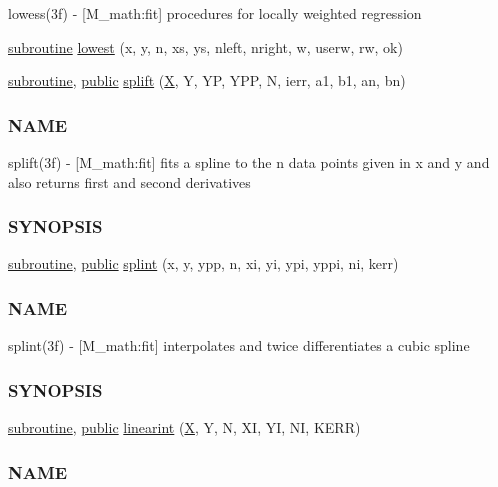 \begin{DoxyCompactItemize}
\begin{DoxyCompactList}
lowess(3f) -\/ \mbox{[}M\+\_\+math\+:fit\mbox{]} procedures for locally weighted regression \end{DoxyCompactList}\item 
\hyperlink{M__stopwatch_83_8txt_acfbcff50169d691ff02d4a123ed70482}{subroutine} \hyperlink{namespacem__math_a06b587e00199906f1f87f1a7b101d71f}{lowest} (x, y, n, xs, ys, nleft, nright, w, userw, rw, ok)
\item 
\hyperlink{M__stopwatch_83_8txt_acfbcff50169d691ff02d4a123ed70482}{subroutine}, \hyperlink{M__stopwatch_83_8txt_a2f74811300c361e53b430611a7d1769f}{public} \hyperlink{namespacem__math_a94f09a43f1a68e7971e12ace802dfcc0}{splift} (\hyperlink{intro__blas1_83_8txt_ac8596739bc875e90fe6e2ecf98e87906}{X}, Y, YP, Y\+PP, N, ierr, a1, b1, an, bn)
\begin{DoxyCompactList}\small\item\em \subsubsection*{N\+A\+ME}

splift(3f) -\/ \mbox{[}M\+\_\+math\+:fit\mbox{]} fits a spline to the n data points given in x and y and also returns first and second derivatives \subsubsection*{S\+Y\+N\+O\+P\+S\+IS}\end{DoxyCompactList}\item 
\hyperlink{M__stopwatch_83_8txt_acfbcff50169d691ff02d4a123ed70482}{subroutine}, \hyperlink{M__stopwatch_83_8txt_a2f74811300c361e53b430611a7d1769f}{public} \hyperlink{namespacem__math_afb412a273368e2814058a8fc4197ba1a}{splint} (x, y, ypp, n, xi, yi, ypi, yppi, ni, kerr)
\begin{DoxyCompactList}\small\item\em \subsubsection*{N\+A\+ME}

splint(3f) -\/ \mbox{[}M\+\_\+math\+:fit\mbox{]} interpolates and twice differentiates a cubic spline \subsubsection*{S\+Y\+N\+O\+P\+S\+IS}\end{DoxyCompactList}\item 
\hyperlink{M__stopwatch_83_8txt_acfbcff50169d691ff02d4a123ed70482}{subroutine}, \hyperlink{M__stopwatch_83_8txt_a2f74811300c361e53b430611a7d1769f}{public} \hyperlink{namespacem__math_a506d6c6d2e4da1fa5efb731608531c75}{linearint} (\hyperlink{intro__blas1_83_8txt_ac8596739bc875e90fe6e2ecf98e87906}{X}, Y, N, XI, YI, NI, K\+E\+RR)
\begin{DoxyCompactList}\small\item\em \subsubsection*{N\+A\+ME}


\end{DoxyCompactList}
\end{DoxyCompactItemize}
